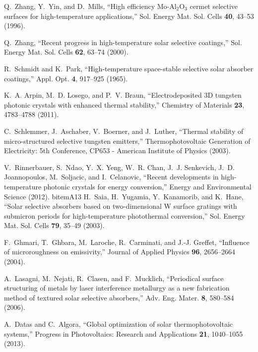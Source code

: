 \documentclass[10pt,letterpaper]{article}
\begin{document}
\begin{thebibliography}{100}
Q.~Zhang, Y.~Yin, and D.~Mills, \enquote{High efficiency {M}o-{A}l$_2${O}$_3$
  cermet selective surfaces for high-temperature applications,} Sol. Energy
  Mat. Sol. Cells \textbf{40}, 43--53 (1996).

Q.~Zhang, \enquote{Recent progress in high-temperature solar selective
  coatings,} Sol. Energy Mat. Sol. Cells \textbf{62}, 63--74 (2000).

R.~Schmidt and K.~Park, \enquote{High-temperature space-stable selective solar
  absorber coatings,} Appl. Opt. \textbf{4}, 917--925 (1965).

K.~A. Arpin, M.~D. Losego, and P.~V. Braun, \enquote{{Electrodeposited 3D
  tungsten photonic crystals with enhanced thermal stability},} Chemistry of
  Materials \textbf{23}, 4783--4788 (2011).

C.~Schlemmer, J.~Aschaber, V.~Boerner, and J.~Luther, \enquote{Thermal
  stability of micro-structured selective tungsten emitters,}
  Thermophotovoltaic Generation of Electricity: 5th Conference, CP653 -
  American Institute of Physics  (2003).

V.~Rinnerbauer, S.~Ndao, Y.~X. Yeng, W.~R. Chan, J.~J. Senkevich, J.~D.
  Joannopoulos, M.~Soljacic, and I.~Celanovic, \enquote{Recent developments in
  high-temperature photonic crystals for energy conversion,} Energy and
  Environmental Science  (2012).
bitem{A13}
H.~Saia, H.~Yugamia, Y.~Kanamorib, and K.~Hane, \enquote{Solar selective
  absorbers based on two-dimensional {W} surface gratings with submicron
  periods for high-temperature photothermal conversion,} Sol. Energy Mat. Sol.
  Cells \textbf{79}, 35--49 (2003).

F.~Ghmari, T.~Ghbara, M.~Laroche, R.~Carminati, and J.-J. Greffet,
  \enquote{Influence of microroughness on emissivity,} Journal of Applied
  Physics \textbf{96}, 2656--2664 (2004).

A.~Lasagni, M.~Nejati, R.~Clasen, and F.~Mucklich, \enquote{Periodical surface
  structuring of metals by laser interference metallurgy as a new fabrication
  method of textured solar selective absorbers,} Adv. Eng. Mater. \textbf{8},
  580--584 (2006).

A.~Datas and C.~Algora, \enquote{Global optimization of solar
  thermophotovoltaic systems,} Progress in Photovoltaics: Research and
  Applications \textbf{21}, 1040--1055 (2013).


\end{thebibliography}
\end{document}
